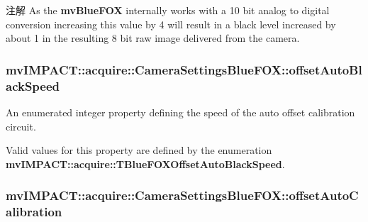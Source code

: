 \begin{DoxyNote}{注解}
As the {\bfseries mv\+Blue\+F\+O\+X} internally works with a 10 bit analog to digital conversion increasing this value by 4 will result in a black level increased by about 1 in the resulting 8 bit raw image delivered from the camera. 
\end{DoxyNote}
\hypertarget{classmv_i_m_p_a_c_t_1_1acquire_1_1_camera_settings_blue_f_o_x_ac7a2cb8906b30b94653d4209740a7733}{
\subsubsection[{offset\+Auto\+Black\+Speed}]{ mv\+I\+M\+P\+A\+C\+T\+::acquire\+::\+Camera\+Settings\+Blue\+F\+O\+X\+::offset\+Auto\+Black\+Speed}}\label{classmv_i_m_p_a_c_t_1_1acquire_1_1_camera_settings_blue_f_o_x_ac7a2cb8906b30b94653d4209740a7733}


An enumerated integer property defining the speed of the auto offset calibration circuit. 

Valid values for this property are defined by the enumeration {\bfseries mv\+I\+M\+P\+A\+C\+T\+::acquire\+::\+T\+Blue\+F\+O\+X\+Offset\+Auto\+Black\+Speed}. \hypertarget{classmv_i_m_p_a_c_t_1_1acquire_1_1_camera_settings_blue_f_o_x_a94b65c4b3b21b5f968ddee1dc804db34}{
\subsubsection[{offset\+Auto\+Calibration}]{ mv\+I\+M\+P\+A\+C\+T\+::acquire\+::\+Camera\+Settings\+Blue\+F\+O\+X\+::offset\+Auto\+Calibration}}\label{classmv_i_m_p_a_c_t_1_1acquire_1_1_camera_settings_blue_f_o_x_a94b65c4b3b21b5f968ddee1dc804db34}


